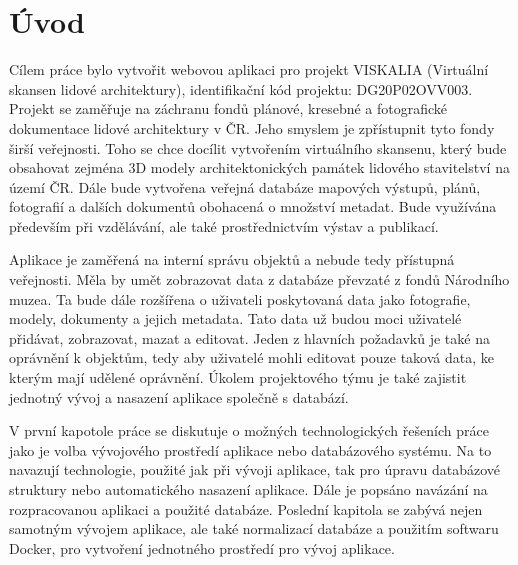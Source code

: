 \chapter*{Úvod}
\label{0-uvod}


Cílem práce bylo vytvořit webovou aplikaci pro projekt VISKALIA
(Virtuální skansen lidové architektury), identifikační kód projektu:
DG20P02OVV003. Projekt se zaměřuje na záchranu fondů plánové, kresebné
a fotografické dokumentace lidové architektury v ČR. Jeho smyslem je
zpřístupnit tyto fondy širší veřejnosti. Toho se chce docílit
vytvořením virtuálního skansenu, který bude obsahovat zejména 3D
modely architektonických památek lidového stavitelství na území
ČR. Dále bude vytvořena veřejná databáze mapových výstupů, plánů,
fotografií a dalších dokumentů obohacená o množství metadat. Bude
využívána především při vzdělávání, ale také prostřednictvím výstav a
publikací.

Aplikace je zaměřená na interní správu objektů a nebude tedy přístupná
veřejnosti. Měla by umět zobrazovat data z databáze převzaté
z fondů Národního muzea. Ta bude dále rozšířena o uživateli poskytovaná
data jako fotografie, modely, dokumenty a jejich metadata. Tato data
už budou moci uživatelé přidávat, zobrazovat, mazat a editovat. Jeden
z hlavních požadavků je také na oprávnění k objektům, tedy aby
uživatelé mohli editovat pouze taková data, ke kterým mají udělené
oprávnění. Úkolem projektového týmu je také zajistit jednotný vývoj a nasazení 
aplikace společně s databází.

V první kapotole práce se diskutuje o možných technologických řešeních práce jako 
je volba vývojového prostředí aplikace nebo databázového systému. Na to navazují 
technologie, použité jak při vývoji aplikace, tak pro úpravu databázové struktury nebo 
automatického nasazení aplikace. Dále je popsáno navázání na rozpracovanou aplikaci a
použité databáze. Poslední kapitola se zabývá nejen samotným vývojem aplikace, ale také 
normalizací databáze a použitím softwaru Docker, pro vytvoření jednotného prostředí pro 
vývoj aplikace.



